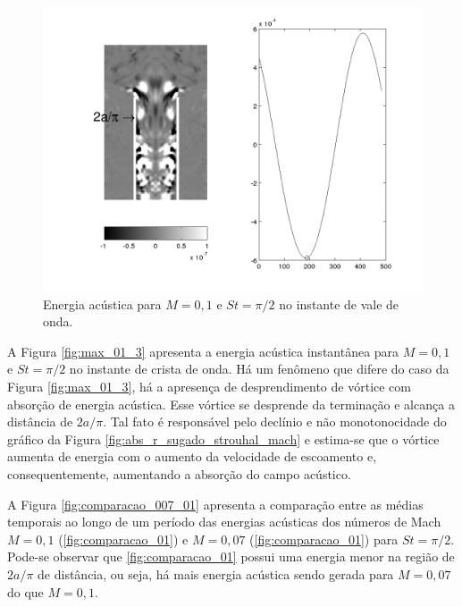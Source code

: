 \begin{figure}[ht!]
\centering
  \includegraphics[width=1.\linewidth]{figuras/max_01_1.png}
  \caption[Energia acústica para $M = 0,1$ e $St = \pi/2$ no instante de vale de onda.]{Energia acústica para $M = 0,1$ e $St = \pi/2$ no instante de vale de onda.}
  \label{fig:max_01_1}
\end{figure}

A Figura \ref{fig:max_01_3} apresenta a energia acústica instantânea para $M = 0,1$ e $St = \pi/2$ no instante de crista de onda. Há um fenômeno que difere do caso da Figura \ref{fig:max_01_3}, há a apresença de desprendimento de vórtice com absorção de energia acústica. Esse vórtice se desprende da terminação e alcança a distância de $2a/\pi$. Tal fato é responsável pelo declínio e não monotonocidade do gráfico da Figura \ref{fig:abs_r_sugado_strouhal_mach} e estima-se que o vórtice aumenta de energia com o aumento da velocidade de escoamento e, consequentemente, aumentando a absorção do campo acústico.

A Figura \ref{fig:comparacao_007_01} apresenta a comparação entre as médias temporais ao longo de um período das energias acústicas dos números de Mach $M = 0,1$ (\ref{fig:comparacao_01}) e $M = 0,07$ (\ref{fig:comparacao_01}) para $St = \pi/2$. Pode-se observar que \ref{fig:comparacao_01} possui uma energia menor na região de $2a/\pi$ de distância, ou seja, há mais energia acústica sendo gerada para $M = 0,07$ do que $M = 0,1$.    

